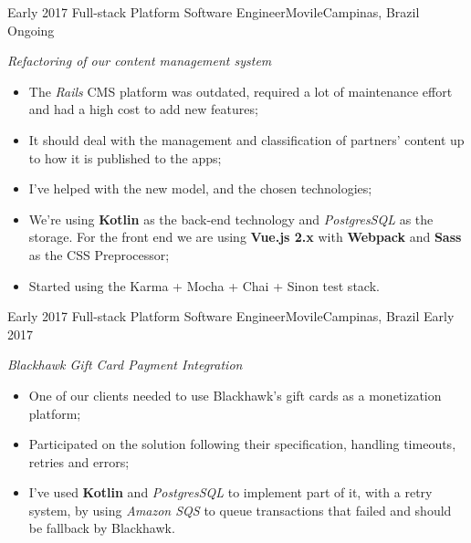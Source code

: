 %
%
%


\begin{experiences}
  \experience
  {Early 2017} {Full-stack Platform Software Engineer}{Movile}{Campinas, Brazil}
  {Ongoing}
        {
        \emph{Refactoring of our content management system}\\
          \begin{itemize}
            \item The \emph{Rails} CMS platform was outdated, required a lot of maintenance effort and had a high cost to add new features;
            \item It should deal with the management and classification of partners' content up to how it is published to the apps;
            \item I've helped with the new model, and the chosen technologies;
            \item We're using \textbf{Kotlin} as the back-end technology and \emph{PostgresSQL} as the storage. For the front end we are using \textbf{Vue.js 2.x} with \textbf{Webpack} and \textbf{Sass} as the CSS Preprocessor;
            \item Started using the Karma + Mocha + Chai + Sinon test stack.\\
          \end{itemize}
        }{}
  \experience
  {Early 2017} {Full-stack Platform Software Engineer}{Movile}{Campinas, Brazil}
  {Early 2017}
        {
        \emph{Blackhawk Gift Card Payment Integration}\\
          \begin{itemize}
            \item One of our clients needed to use Blackhawk's gift cards as a monetization platform;
            \item Participated on the solution following their specification, handling timeouts, retries and errors;
            \item I've used \textbf{Kotlin} and \emph{PostgresSQL} to implement part of it, with a retry system, by using \emph{Amazon SQS} to queue
            transactions that failed and should be fallback by Blackhawk.\\

\end{itemize}}
\end{experiences}
